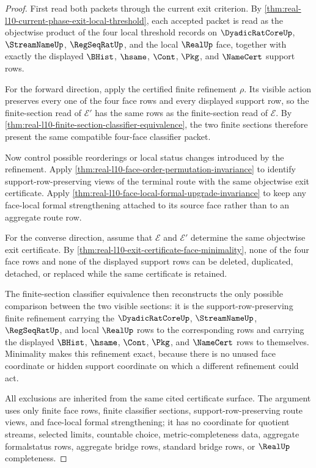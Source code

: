 \begin{proof}
First read both packets through the current exit criterion. By \autoref{thm:real-l10-current-phase-exit-local-threshold}, each accepted packet is read as the objectwise product of the four local threshold records on $\DyadicRatCoreUp$, $\StreamNameUp$, $\RegSeqRatUp$, and the local $\RealUp$ face, together with exactly the displayed $\BHist$, $\hsame$, $\Cont$, $\Pkg$, and $\NameCert$ support rows.

For the forward direction, apply the certified finite refinement $\rho$. Its visible action preserves every one of the four face rows and every displayed support row, so the finite-section read of $\mathcal E'$ has the same rows as the finite-section read of $\mathcal E$. By \autoref{thm:real-l10-finite-section-classifier-equivalence}, the two finite sections therefore present the same compatible four-face classifier packet.

Now control possible reorderings or local status changes introduced by the refinement. Apply \autoref{thm:real-l10-face-order-permutation-invariance} to identify support-row-preserving views of the terminal route with the same objectwise exit certificate. Apply \autoref{thm:real-l10-face-local-formal-upgrade-invariance} to keep any face-local formal strengthening attached to its source face rather than to an aggregate route row.

For the converse direction, assume that $\mathcal E$ and $\mathcal E'$ determine the same objectwise exit certificate. By \autoref{thm:real-l10-exit-certificate-face-minimality}, none of the four face rows and none of the displayed support rows can be deleted, duplicated, detached, or replaced while the same certificate is retained.

The finite-section classifier equivalence then reconstructs the only possible comparison between the two visible sections: it is the support-row-preserving finite refinement carrying the $\DyadicRatCoreUp$, $\StreamNameUp$, $\RegSeqRatUp$, and local $\RealUp$ rows to the corresponding rows and carrying the displayed $\BHist$, $\hsame$, $\Cont$, $\Pkg$, and $\NameCert$ rows to themselves. Minimality makes this refinement exact, because there is no unused face coordinate or hidden support coordinate on which a different refinement could act.

All exclusions are inherited from the same cited certificate surface. The argument uses only finite face rows, finite classifier sections, support-row-preserving route views, and face-local formal strengthening; it has no coordinate for quotient streams, selected limits, countable choice, metric-completeness data, aggregate formalstatus rows, aggregate bridge rows, standard bridge rows, or $\RealUp$ completeness.
\end{proof}

